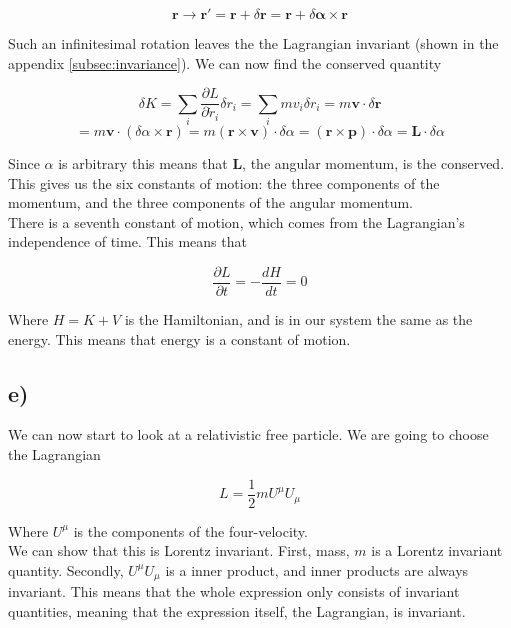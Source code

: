 \documentclass[a4paper,norsk, 10pt]{article}
\begin{document}
$$
\mathbf{r} \rightarrow \mathbf{r}' = \mathbf{r} + \delta\mathbf{r} = \mathbf{r} + \delta\mathbf{\alpha}\times \mathbf{r}
$$

Such an infinitesimal rotation leaves the the Lagrangian invariant (shown in the appendix \ref{subsec:invariance}). We can now find the conserved quantity

$$
\delta K = \sum_i \frac{\partial L}{\partial \dot{r}_i}\delta r_i = \sum_i mv_i \delta r_i = m\mathbf{v}\cdot\delta\mathbf{r}
$$
$$
= m\mathbf{v}\cdot (\delta\alpha\times \mathbf{r}) = m(\mathbf{r}\times \mathbf{v}) \cdot \delta \alpha = (\mathbf{r}\times \mathbf{p})\cdot\delta\alpha = \mathbf{L}\cdot\delta\alpha
$$

Since $\alpha$ is arbitrary this means that $\mathbf{L}$, the angular momentum, is the conserved.\\

This gives us the six constants of motion: the three components of the momentum, and the three components of the angular momentum.\\

There is a seventh constant of motion, which comes from the Lagrangian's independence of time. This means that

$$
\frac{\partial L}{\partial t} = - \frac{dH}{dt} = 0
$$

Where $H = K + V$ is the Hamiltonian, and is in our system the same as the energy. This means that energy is a constant of motion.

\subsection*{e)}

We can now start to look at a relativistic free particle. We are going to choose the Lagrangian

\begin{equation}
L = \frac{1}{2}mU^{\mu}U_{\mu}
\label{eq:relativisticLagrangian}
\end{equation}

Where $U^{\mu}$ is the components of the four-velocity.\\

We can show that this is Lorentz invariant. First, mass, $m$ is a Lorentz invariant quantity. Secondly, $U^{\mu}U_{\mu}$ is a inner product, and inner products are always invariant. This means that the whole expression only consists of invariant quantities, meaning that the expression itself, the Lagrangian, is invariant.
\end{document}
